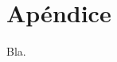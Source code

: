 \documentclass{ci5652}
\begin{document}

\newpage
\section*{Apéndice}

Bla.



%
%
%
\end{document}
